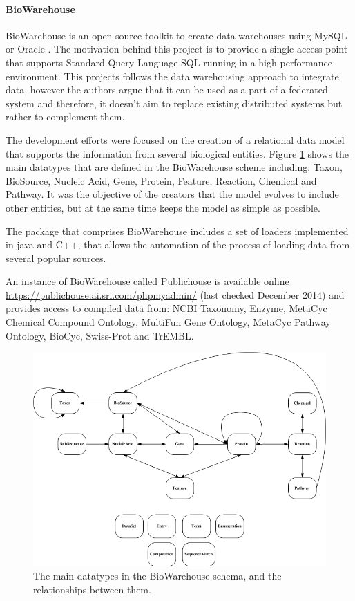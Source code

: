 \paragraph{BioWarehouse}
BioWarehouse is an open source toolkit to create data warehouses using MySQL or Oracle \cite{LEE2006}. The motivation behind this project is to provide  a single access point that supports Standard Query Language SQL running in a high performance environment.
This projects follows the data warehousing approach to integrate data, however the authors argue that it can be used as a part of a federated system and therefore, it doesn't aim to replace existing distributed systems but rather to complement them.

The development efforts were focused on the creation of a relational data model that supports the information from several biological entities. Figure \ref{fig:biowarehouse} shows the main datatypes that are defined in the BioWarehouse scheme including: Taxon, BioSource, Nucleic Acid, Gene, Protein, Feature, Reaction, Chemical and Pathway. It was the objective of the creators that the model evolves to include other entities, but at the same time keeps the model as simple as possible.

The package that comprises BioWarehouse includes a set of loaders implemented in java and C++, that allows the automation of the process of loading data from several popular sources. 

An instance of BioWarehouse called Publichouse is available online \url{https://publichouse.ai.sri.com/phpmyadmin/} (last checked December 2014) and provides access to compiled data from: NCBI Taxonomy, Enzyme, MetaCyc Chemical Compound Ontology, MultiFun Gene Ontology, MetaCyc Pathway Ontology, BioCyc, Swiss-Prot and TrEMBL.

\begin{figure}  
\centering
\includegraphics[width=5in]{figures/biowarehouse.png}
\caption[Original BioWarehouse schema.]{The main datatypes in the BioWarehouse schema, and the relationships between them.
\label{fig:biowarehouse}}
\end{figure}

